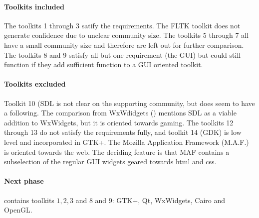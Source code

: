 \paragraph{Toolkits included} The toolkits 1 through 3 satify the requirements. 
The {\sf FLTK} toolkit does not generate confidence due to unclear community size. 
The toolkits 5 through 7 all have a small community size and therefore are left out for further comparison. 
The toolkits 8 and 9 satisfy all but one requirement (the GUI) but could still function if they 
add sufficient function to a GUI oriented toolkit. 

\paragraph{Toolkits excluded}
Toolkit 10 ({\sf SDL} is not clear on the supporting community, but does seem to have a following. 
The comparison from WxWdidgets (\cite{wxwidget:comparison}) mentions {\sf SDL} as a viable addition 
to WxWidgets, but it is oriented towards gaming. The toolkits 12 through 13 do not satisfy the 
requirements fully, and toolkit 14 (GDK) is low level and incorporated in {\sf GTK+}. 
The Mozilla Application Framework ({\sf M.A.F.}) is oriented towards the web. The deciding feature 
is that {\sf MAF} contains a subselection of the regular GUI widgets geared towards html and css.

\paragraph{Next phase}
contains toolkits $1, 2, 3$ and 8 and 9: {\sf GTK+, Qt, WxWidgets, Cairo and OpenGL}. 
